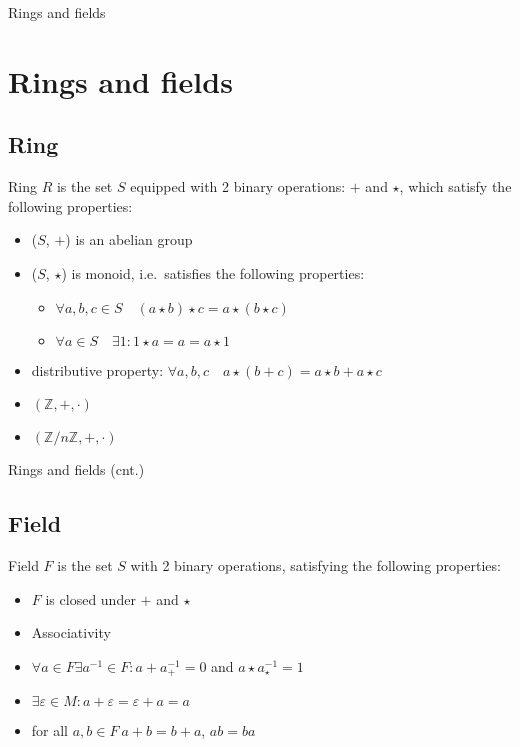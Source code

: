 \documentclass{beamer}
\begin{document}
\begin{frame}{Rings and fields}
	\section{Rings and fields}
	\subsection{Ring}
	\begin{definition}[Ring]
		Ring $R$ is the set $S$ equipped with 2 binary operations: $+$ and 
		$\star$, which satisfy the following properties:
		\begin{itemize}
			\item ($S$, $+$) is an abelian group
			\item ($S$, $\star$) is monoid, i.e.\ satisfies the following 
			properties:
			\begin{itemize}
				\item $\forall a, b, c \in S \quad (a \star b) \star c = a \star (b \star c)$
				\item $\forall a \in S \quad \exists 1: 1 \star a = a = a \star 1$
			\end{itemize}
			\item distributive property: $\forall a, b, c \quad a \star (b + c) = a \star b + a \star c$ 
		\end{itemize}
	\end{definition}

	\begin{example}
		\begin{itemize}
			\item $(\mathbb{Z}, +, \cdot)$
			\item $(\mathbb{Z} / n \mathbb{Z}, +, \cdot)$
		\end{itemize}
	\end{example}
\end{frame}

\begin{frame}{Rings and fields (cnt.)}
	\subsection{Field}
	\begin{definition}[field]
		Field $F$ is the set $S$ with 2 binary operations, satisfying the 
		following properties:
		\begin{itemize}
			\item $F$ is closed under $+$ and $\star$
			\item Associativity
			\item $\forall a \in F \exists a^{-1} \in F: a + a^{-1}_{+} = 0$ and $a \star a^{-1}_{\star} = 1$
			\item $\exists \varepsilon \in M : a + \varepsilon = \varepsilon + a = a$
			\item for all $a, b \in F\ a + b = b + a$, $ab = ba$
		\end{itemize}
	\end{definition}
\end{frame}
\end{document}
